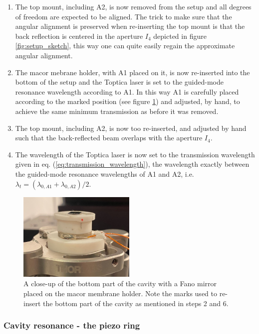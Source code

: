 \begin{enumerate}
    \item The top mount, including A2, is now removed from the setup and all degrees of freedom are expected to be aligned. The trick to make sure that the angular alignment is preserved when re-inserting the top mount is that the back reflection is centered in the aperture $I_4$ depicted in figure \ref{fig:setup_sketch}, this way one can quite easily regain the approximate angular alignment.
    \item The macor mebrane holder, with A1 placed on it, is now re-inserted into the bottom of the setup and the Toptica laser is set to the guided-mode resonance wavelength according to A1. In this way A1 is carefully placed according to the marked position (see figure \ref{fig:bottom_with_alignment_mark}) and adjusted, by hand, to achieve the same minimum transmission as before it was removed. 
    \item The top mount, including A2, is now too re-inserted, and adjusted by hand such that the back-reflected beam overlaps with the aperture $I_4$. 
    \item The wavelength of the Toptica laser is now set to the transmission wavelength given in eq. (\ref{eq:transmission_wavelength}), the wavelength exactly between the guided-mode resonance wavelengths of A1 and A2, i.e. $\lambda_t = (\lambda_{0,A1} + \lambda_{0,A2})/2$. 
\end{enumerate}

\begin{figure}[h!]
    \centering
    \includegraphics[width=0.5\textwidth]{figures/bottom_with_alignement_mark.pdf}
    \caption{A close-up of the bottom part of the cavity with a Fano mirror placed on the macor membrane holder. Note the marks used to re-insert the bottom part of the cavity as mentioned in steps 2 and 6.}
    \label{fig:bottom_with_alignment_mark}
\end{figure}

\subsubsection{Cavity resonance - the piezo ring}

